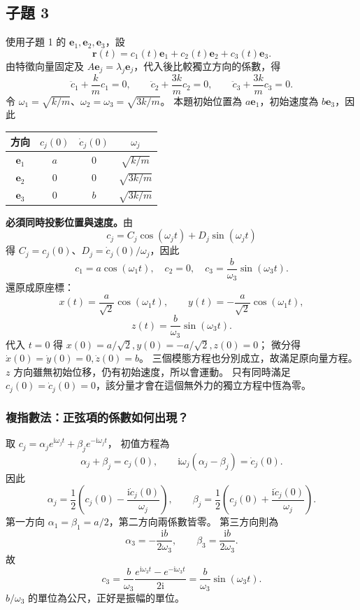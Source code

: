 \documentclass[12pt,a4paper]{article}
\renewcommand{\arraystretch}{1.3}
\begin{document}
\subsection*{子題 3}
使用子題 1 的 \(\mathbf e_1,\mathbf e_2,\mathbf e_3\)，設
\[
  \mathbf r(t)=c_1(t)\mathbf e_1+c_2(t)\mathbf e_2+c_3(t)\mathbf e_3.
\]
由特徵向量固定及 \(A\mathbf e_j=\lambda_j\mathbf e_j\)，代入後比較獨立方向的係數，得
\[
  \ddot c_1+\frac{k}{m}c_1=0,\qquad
  \ddot c_2+\frac{3k}{m}c_2=0,\qquad
  \ddot c_3+\frac{3k}{m}c_3=0.
\]
令 \(\omega_1=\sqrt{k/m}\)、\(\omega_2=\omega_3=\sqrt{3k/m}\)。
本題初始位置為 \(a\mathbf e_1\)，初始速度為 \(b\mathbf e_3\)，因此
\begin{center}
  \renewcommand{\arraystretch}{1.4}
  \begin{tabular}{c|c|c|c}
    方向              & \(c_j(0)\) & \(\dot c_j(0)\) & \(\omega_j\)    \\\hline
    \(\mathbf e_1\) & \(a\)      & \(0\)           & \(\sqrt{k/m}\)  \\
    \(\mathbf e_2\) & \(0\)      & \(0\)           & \(\sqrt{3k/m}\) \\
    \(\mathbf e_3\) & \(0\)      & \(b\)           & \(\sqrt{3k/m}\)
  \end{tabular}
\end{center}
\textbf{必須同時投影位置與速度。}由
\[
  c_j=C_j\cos(\omega_jt)+D_j\sin(\omega_jt)
\]
得 \(C_j=c_j(0)\)、\(D_j=\dot c_j(0)/\omega_j\)，因此
\[
  \boxed{c_1=a\cos(\omega_1t),\quad c_2=0,\quad c_3=\frac b{\omega_3}\sin(\omega_3t)}.
\]
還原成原座標：
\[
  \boxed{x(t)=\frac a{\sqrt2}\cos(\omega_1t)},\qquad
  \boxed{y(t)=-\frac a{\sqrt2}\cos(\omega_1t)},
\]
\[
  \boxed{z(t)=\frac b{\omega_3}\sin(\omega_3t)}.
\]
代入 \(t=0\) 得 \(x(0)=a/\sqrt2,y(0)=-a/\sqrt2,z(0)=0\)；
微分得 \(\dot x(0)=\dot y(0)=0,\dot z(0)=b\)。
三個模態方程也分別成立，故滿足原向量方程。
\(z\) 方向雖無初始位移，仍有初始速度，所以會運動。
只有同時滿足 \(c_j(0)=\dot c_j(0)=0\)，該分量才會在這個無外力的獨立方程中恆為零。

\subsubsection*{複指數法：正弦項的係數如何出現？}
取 \(c_j=\alpha_j e^{\mathrm i\omega_jt}+\beta_j e^{-\mathrm i\omega_jt}\)，
初值方程為
\[
  \alpha_j+\beta_j=c_j(0),\qquad
  \mathrm i\omega_j(\alpha_j-\beta_j)=\dot c_j(0).
\]
因此
\[
  \alpha_j=\frac12\left(c_j(0)-\frac{\mathrm i\dot c_j(0)}{\omega_j}\right),\qquad
  \beta_j=\frac12\left(c_j(0)+\frac{\mathrm i\dot c_j(0)}{\omega_j}\right).
\]
第一方向 \(\alpha_1=\beta_1=a/2\)，第二方向兩係數皆零。
第三方向則為
\[
  \alpha_3=-\frac{\mathrm i b}{2\omega_3},\qquad
  \beta_3=\frac{\mathrm i b}{2\omega_3}.
\]
故
\[
  c_3=\frac b{\omega_3}
  \frac{e^{\mathrm i\omega_3t}-e^{-\mathrm i\omega_3t}}{2\mathrm i}
  =\frac b{\omega_3}\sin(\omega_3t).
\]
\(b/\omega_3\) 的單位為公尺，正好是振幅的單位。
\end{document}
